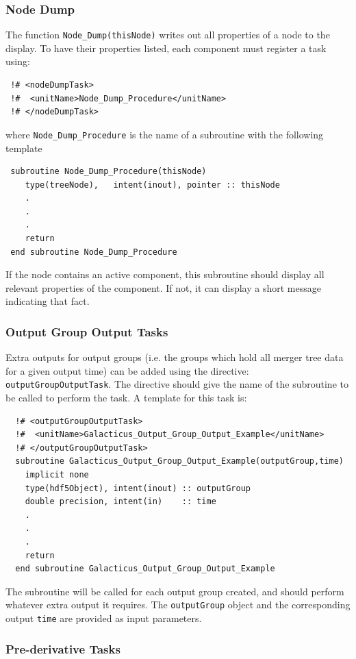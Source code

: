 \subsubsection{Node Dump}

The function {\tt Node\_Dump(thisNode)} writes out all properties of a node to the display. To have their properties listed, each component must register a task using:
\begin{verbatim}
 !# <nodeDumpTask>
 !#  <unitName>Node_Dump_Procedure</unitName>
 !# </nodeDumpTask>
\end{verbatim}
where {\tt Node\_Dump\_Procedure} is the name of a subroutine with the following template
\begin{verbatim}
 subroutine Node_Dump_Procedure(thisNode)
    type(treeNode),   intent(inout), pointer :: thisNode
    .
    .
    .
    return
 end subroutine Node_Dump_Procedure
\end{verbatim}
If the node contains an active component, this subroutine should display all relevant properties of the component. If not, it can display a short message indicating that fact.

\subsubsection{Output Group Output Tasks}

Extra outputs for output groups (i.e. the groups which hold all merger tree data for a given output time) can be added using the directive: {\tt outputGroupOutputTask}. The directive should give the name of the subroutine to be called to perform the task. A template for this task is:
\begin{verbatim}
  !# <outputGroupOutputTask>
  !#  <unitName>Galacticus_Output_Group_Output_Example</unitName>
  !# </outputGroupOutputTask>
  subroutine Galacticus_Output_Group_Output_Example(outputGroup,time)
    implicit none
    type(hdf5Object), intent(inout) :: outputGroup
    double precision, intent(in)    :: time
    .
    .
    .
    return
  end subroutine Galacticus_Output_Group_Output_Example
\end{verbatim}
The subroutine will be called for each output group created, and should perform whatever extra output it requires. The {\tt outputGroup} object and the corresponding output {\tt time} are provided as input parameters.

\subsubsection{Pre-derivative Tasks}

